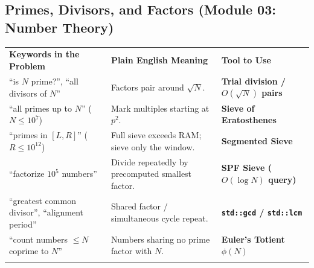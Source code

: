 \documentclass[11pt,a4paper]{article}
\begin{document}
\subsection{Primes, Divisors, and Factors (Module 03: Number Theory)}
\begingroup\footnotesize{}
\begin{tabularx}{\textwidth}{>{\raggedright\arraybackslash}p{4.4cm} >{\raggedright\arraybackslash}X >{\raggedright\arraybackslash\bfseries}p{4.0cm}}
\arrayrulecolor{primaryblue}\toprule[1.1pt]
\rowcolor{primaryblue!10}
\textcolor{primaryblue}{\textbf{Keywords in the Problem}} & \textcolor{primaryblue}{\textbf{Plain English Meaning}} & \textcolor{primaryblue}{\textbf{Tool to Use}} \\
\arrayrulecolor{codeframe}\midrule[0.6pt]
``is $N$ prime?'', ``all divisors of $N$'' & Factors pair around $\sqrt{N}$. & Trial division / $O(\sqrt{N})$ pairs \\
``all primes up to $N$'' ($N \le 10^7$) & Mark multiples starting at $p^2$. & Sieve of Eratosthenes \\
``primes in $[L, R]$'' ($R \le 10^{12}$) & Full sieve exceeds RAM; sieve only the window. & Segmented Sieve \\
``factorize $10^5$ numbers'' & Divide repeatedly by precomputed smallest factor. & SPF Sieve ($O(\log N)$ query) \\
``greatest common divisor'', ``alignment period'' & Shared factor / simultaneous cycle repeat. & \texttt{std::gcd} / \texttt{std::lcm} \\
``count numbers $\le N$ coprime to $N$'' & Numbers sharing no prime factor with $N$. & Euler's Totient $\phi(N)$ \\
\arrayrulecolor{primaryblue}\bottomrule[1.1pt]
\end{tabularx}\endgroup
\end{document}
